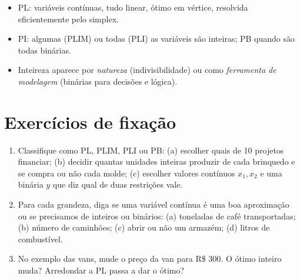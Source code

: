 \begin{resumo}
\begin{itemize}
  \item PL: variáveis contínuas, tudo linear, ótimo em vértice, resolvida eficientemente pelo simplex.
  \item PI: algumas (PLIM) ou todas (PLI) as variáveis são inteiras; PB quando são todas binárias.
  \item Inteireza aparece por \emph{natureza} (indivisibilidade) ou como \emph{ferramenta de modelagem} (binárias
  para decisões e lógica).
\end{itemize}
\end{resumo}

\section*{Exercícios de fixação}
\begin{enumerate}[label=\textbf{1.\arabic*}]
  \item Classifique como PL, PLIM, PLI ou PB: (a) escolher quais de 10 projetos financiar; (b) decidir quantas
  unidades inteiras produzir de cada brinquedo e se compra ou não cada molde; (c) escolher valores contínuos
  $x_1,x_2$ e uma binária $y$ que diz qual de duas restrições vale.
  \item Para cada grandeza, diga se uma variável contínua é uma boa aproximação ou se precisamos de inteiros ou
  binários: (a) toneladas de café transportadas; (b) número de caminhões; (c) abrir ou não um armazém;
  (d) litros de combustível.
  \item No exemplo das vans, mude o preço da van para R\$ 300. O ótimo inteiro muda? Arredondar a PL passa a dar o
  ótimo?
\end{enumerate}

